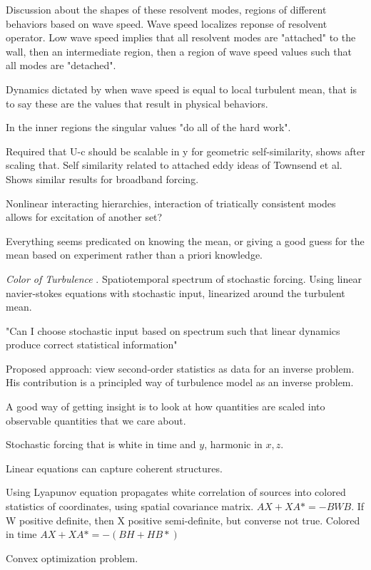 \begin{description}
{\begin{description}
Discussion about the shapes of these resolvent modes, regions of different behaviors
based on wave speed. Wave speed localizes reponse of resolvent operator. Low wave
speed implies that all resolvent modes are "attached" to the wall, then an
intermediate region, then a region of wave speed values such that all modes
are "detached".

Dynamics dictated by when wave speed is equal to local turbulent mean, that is to say these
are the values that result in physical behaviors.

In the inner regions the singular values "do all of the hard work".

Required that U-c should be scalable in y for geometric self-similarity, shows after scaling
that.
Self similarity related to attached eddy ideas of Townsend et al.
Shows similar results for broadband forcing.

Nonlinear interacting hierarchies, interaction of triatically consistent modes allows
for excitation of another set?

Everything seems predicated on knowing the mean, or giving a good guess for the mean based
on experiment rather than a priori knowledge.
\item[M. Jovanovi\'c]
\textit{Color of Turbulence}
.
Spatiotemporal spectrum of stochastic forcing. Using linear navier-stokes equations with
stochastic input, linearized around the turbulent mean.

"Can I choose stochastic input based on spectrum such that linear dynamics produce correct
statistical information"

Proposed approach: view second-order statistics as data for an inverse problem. His contribution
is a principled way of turbulence model as an inverse problem.

A good way of getting insight is to look at how quantities are scaled into observable
quantities that we care about.

Stochastic forcing that is white in time and $y$, harmonic in $x,z$.

Linear equations can capture coherent structures.

Using Lyapunov equation propagates white correlation of sources into colored statistics
of coordinates, using spatial covariance matrix. $AX+ XA* = -BWB$.
If W positive definite, then X positive semi-definite, but converse not true.
Colored in time $AX +XA* = -(BH +HB*)$

Convex optimization problem.


\end{description}}
\end{description}
